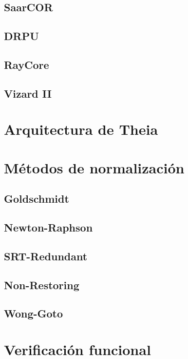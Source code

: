 \subsection{SaarCOR}
\subsection{DRPU}
\subsection{RayCore}
\subsection{Vizard II}

\section{Arquitectura de Theia}

\section{Métodos de normalización}

\subsection{Goldschmidt}

\subsection{Newton-Raphson}

\subsection{SRT-Redundant}

\subsection{Non-Restoring}

\subsection{Wong-Goto}



\section{Verificación funcional}